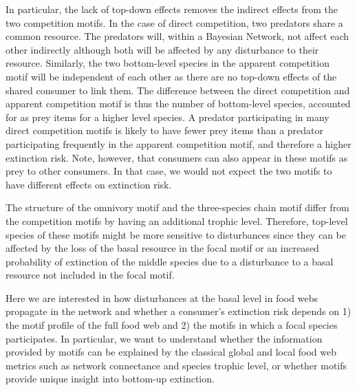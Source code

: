\documentclass[12pt]{article}
\begin{document}
\begin{spacing}{2.0}
    
    In particular, the lack of top-down effects removes the indirect effects from the two competition motifs. In the case of direct competition, two predators share a common resource. The predators will, within a Bayesian Network, not affect each other indirectly although both will be affected by any disturbance to their resource. Similarly, the two bottom-level species in the apparent competition motif will be independent of each other as there are no top-down effects of the shared consumer to link them.
    The difference between the direct competition and apparent competition motif is thus the number of bottom-level species, accounted for as prey items for a higher level species.
    A predator participating in many direct competition motifs is likely to have fewer prey items than a predator participating frequently in the apparent competition motif, and therefore a higher extinction risk.
    Note, however, that consumers can also appear in these motifs as prey to other consumers.  
    In that case, we would not expect the two motifs to have different effects on extinction risk.
    
    
    The structure of the omnivory motif and the three-species chain motif differ from the competition motifs by having an additional trophic level. Therefore, top-level species of these motifs might be more sensitive to disturbances since they can be affected by the loss of the basal resource in the focal motif or an increased probability of extinction of the middle species due to a disturbance to a basal resource not included in the focal motif. 

    Here we are interested in how disturbances at the basal level in food webs propagate in the network and whether a consumer's extinction risk depends on 1) the motif profile of the full food web and 2) the motifs in which a focal species participates. In particular, we want to understand whether the information provided by motifs can be explained by the classical global and local food web metrics such as network connectance and species trophic level, or whether motifs provide unique insight into bottom-up extinction.
  
    


\end{spacing}
\end{document}
